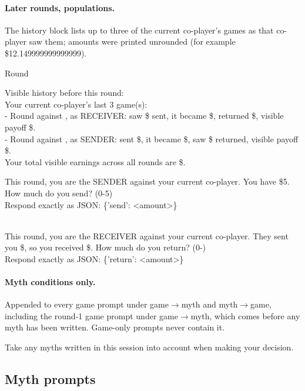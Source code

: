 \paragraph{Later rounds, populations.} The history block lists up to three of the current co-player's games as that co-player saw them; amounts were printed unrounded (for example \$12.149999999999999).
\begin{promptbox}
Round 

Visible history before this round:\\
Your current co-player's last 3 game(s):\\
- Round  against , as RECEIVER: saw \$ sent, it became \$, returned \$, visible payoff \$.\\
- Round  against , as SENDER: sent \$, it became \$, saw \$ returned, visible payoff \$.\\
Your total visible earnings across all rounds are \$.

This round, you are the SENDER against your current co-player. You have \$5. How much do you send? (0-5)\\
Respond exactly as JSON: \{'send': <amount>\}
\end{promptbox}
\begin{promptbox}
\\
This round, you are the RECEIVER against your current co-player. They sent you \$, so you received \$. How much do you return? (0-)\\
Respond exactly as JSON: \{'return': <amount>\}
\end{promptbox}

\paragraph{Myth conditions only.} Appended to every game prompt under game$\rightarrow$myth and myth$\rightarrow$game, including the round-1 game prompt under game$\rightarrow$myth, which comes before any myth has been written. Game-only prompts never contain it.
\begin{promptbox}
Take any myths written in this session into account when making your decision.
\end{promptbox}

\subsection{Myth prompts}
